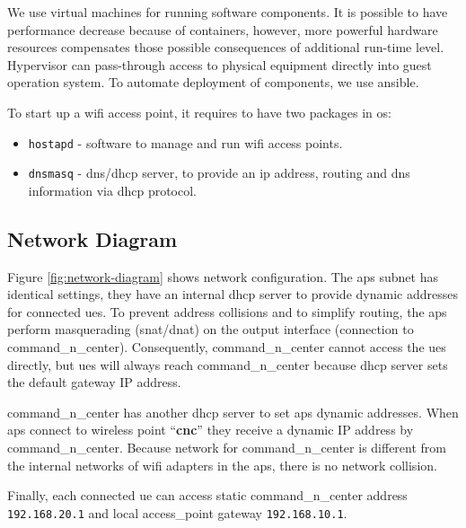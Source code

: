 We use virtual machines for running software components. It is possible to 
have performance decrease because of containers, however, more powerful
hardware resources compensates those possible consequences of additional 
run-time level. Hypervisor can pass-through access to physical equipment directly into guest operation system. To automate deployment of components, we use \gls{ansible}.

To start up a \gls{wifi} access point, it requires to have two packages in \acrshort{os}:

\begin{itemize}
\tightlist
\item
  \texttt{hostapd} - software to manage and run \gls{wifi} access points.
\item
  \texttt{dnsmasq} - \acrshort{dns}/\acrshort{dhcp} server, to provide an \acrshort{ip} address, routing
  and \acrshort{dns} information via \acrshort{dhcp} protocol.
\end{itemize}

\subsection{Network Diagram}\label{network-diagram}


Figure \ref{fig:network-diagram} shows network configuration. The \glspl{ap} subnet has identical settings, they have an internal \gls{dhcp} server to provide dynamic addresses for connected \glspl{ue}. To prevent address collisions and to simplify routing, the \glspl{ap} perform masquerading (\acrshort{snat}/\acrshort{dnat}) on the output interface (connection to \gls{command_n_center}). Consequently, \gls{command_n_center} cannot access the \glspl{ue} directly, but \glspl{ue} will always reach \gls{command_n_center} because \acrshort{dhcp} server sets the default gateway IP address.

\gls{command_n_center} has another \acrshort{dhcp} server to set \glspl{ap} dynamic addresses. When \glspl{ap} connect to wireless point
``\textbf{cnc}'' they receive a dynamic IP address by \gls{command_n_center}.  Because network for \gls{command_n_center} is different from the internal networks of \gls{wifi} adapters in the \glspl{ap}, there is no network collision.

Finally, each connected \gls{ue} can access static \gls{command_n_center} address \texttt{192.168.20.1}
and local \acrshort{access_point} gateway \texttt{192.168.10.1}.


